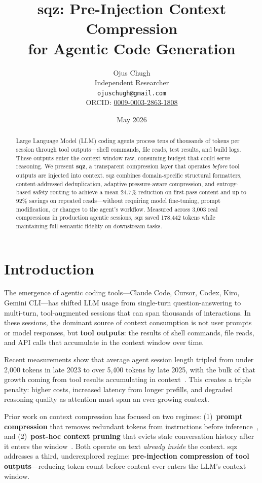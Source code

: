 \documentclass[10pt,twocolumn]{article}
\title{\textbf{sqz: Pre-Injection Context Compression\\for Agentic Code Generation}}
\author{
  Ojus Chugh\\
  Independent Researcher\\
  \texttt{ojuschugh@gmail.com}\\
  ORCID: \href{https://orcid.org/0009-0003-2863-1808}{0009-0003-2863-1808}
}
\date{May 2026}
\begin{document}
\maketitle

\begin{abstract}
Large Language Model (LLM) coding agents process tens of thousands of tokens per session through tool outputs---shell commands, file reads, test results, and build logs. These outputs enter the context window raw, consuming budget that could serve reasoning. We present \textbf{sqz}, a transparent compression layer that operates \emph{before} tool outputs are injected into context. sqz combines domain-specific structural formatters, content-addressed deduplication, adaptive pressure-aware compression, and entropy-based safety routing to achieve a mean 24.7\% reduction on first-pass content and up to 92\% savings on repeated reads---without requiring model fine-tuning, prompt modification, or changes to the agent's workflow. Measured across 3,003 real compressions in production agentic sessions, sqz saved 178,442 tokens while maintaining full semantic fidelity on downstream tasks.
\end{abstract}

\section{Introduction}

The emergence of agentic coding tools---Claude Code, Cursor, Codex, Kiro, Gemini CLI---has shifted LLM usage from single-turn question-answering to multi-turn, tool-augmented sessions that can span thousands of interactions. In these sessions, the dominant source of context consumption is not user prompts or model responses, but \textbf{tool outputs}: the results of shell commands, file reads, and API calls that accumulate in the context window over time.

Recent measurements show that average agent session length tripled from under 2,000 tokens in late 2023 to over 5,400 tokens by late 2025, with the bulk of that growth coming from tool results accumulating in context~\cite{pan2026tool}. This creates a triple penalty: higher costs, increased latency from longer prefills, and degraded reasoning quality as attention must span an ever-growing context.

Prior work on context compression has focused on two regimes: (1)~\textbf{prompt compression} that removes redundant tokens from instructions before inference~\cite{jiang2023llmlingua,pan2024llmlingua2,wang2024lightning}, and (2)~\textbf{post-hoc context pruning} that evicts stale conversation history after it enters the window~\cite{anagnostidis2023dynamic,acon2024}. Both operate on text \emph{already inside} the context. sqz addresses a third, underexplored regime: \textbf{pre-injection compression of tool outputs}---reducing token count before content ever enters the LLM's context window.
\end{document}
